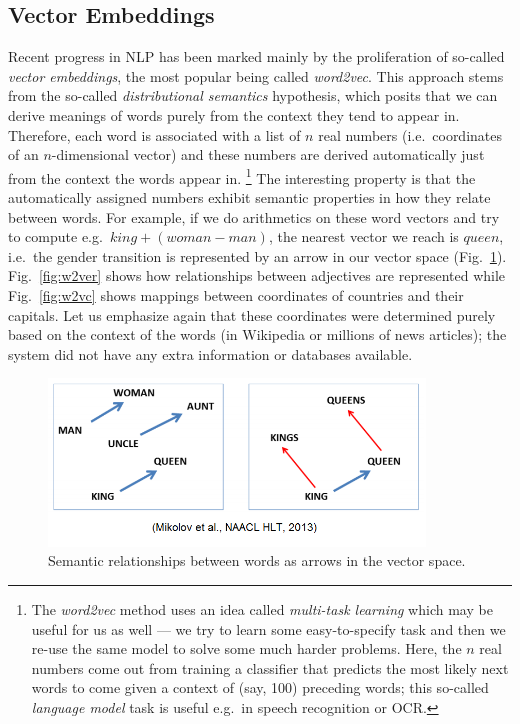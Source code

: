 \documentclass[11pt,a4paper]{article}
\begin{document}
\subsection{Vector Embeddings}

Recent progress in NLP has been marked mainly by the proliferation of
so-called \textit{vector embeddings}, the most popular being called
\textit{word2vec}.  This approach stems from the so-called \textit{distributional semantics}
hypothesis, which posits that we can derive meanings of words purely
from the context they tend to appear in.  Therefore, each word is
associated with a list of $n$ real numbers (i.e.\ coordinates of
an $n$-dimensional vector) and these numbers are derived automatically
just from the context the words appear in.%
\footnote{The \textit{word2vec} method uses an idea called \textit{multi-task learning}
	which may be useful for us as well --- we try to learn
	some easy-to-specify task and then we re-use the same model to
	solve some much harder problems.  Here, the $n$ real numbers
	come out from training a classifier that predicts the most likely
	next words to come given a context of (say, 100) preceding words;
	this so-called \textit{language model} task is useful e.g.\ in
	speech recognition or OCR.}
The interesting property is that the automatically assigned numbers
exhibit semantic properties in how they relate between words.
For example, if we do arithmetics on these word vectors and try
to compute e.g.\ $king + (woman - man)$, the nearest vector we reach
is $queen$, i.e.\ the gender transition is represented by an arrow
in our vector space (Fig.~\ref{fig:w2vg}).
Fig.~\ref{fig:w2ver} shows how relationships between adjectives are represented
while Fig.~\ref{fig:w2vc} shows mappings between coordinates of countries
and their capitals.  Let us emphasize again that these coordinates were
determined purely based on the context of the words (in Wikipedia or
millions of news articles); the system did not have any extra information
or databases available.

\begin{figure}[ht]
	\centering
	\includegraphics[width=10cm]{kingqueen.png}
	\caption{Semantic relationships between words as arrows in the vector space. \cite{WordVecLingReg}}
	\label{fig:w2vg}
\end{figure}
\end{document}
